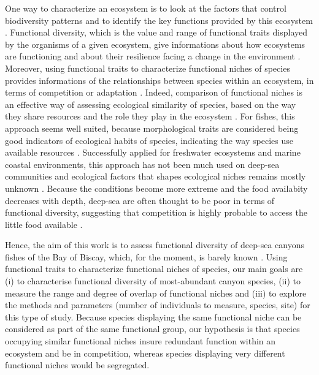 One way to characterize an ecosystem is to look at the factors that control biodiversity patterns and to identify the key functions provided by this ecosystem \citep{aneeshkumar2017,brindamour2011,farre2016}. Functional diversity, which is the value and range of functional traits displayed by the organisms of a given ecosystem, give informations about how ecosystems are functioning and about their resilience facing a change in the environment \citep{dumay2004,martini2020}. Moreover, using functional traits to characterize functional niches of species provides informations of the relationships between species within an ecosystem, in terms of competition or adaptation \citep{aneeshkumar2017}. Indeed, comparison of functional niches is an effective way of assessing ecological similarity of species, based on the way they share resources and the role they play in the ecosystem \citep{aneeshkumar2017,farre2016,winemiller1991}.
For fishes, this approach seems well suited, because morphological traits are considered being good indicators of ecological habits of species, indicating the way species use available resources \citep{farre2016,winemiller1991}. Successfully applied for freshwater ecosystems and marine coastal environments, this approach has not been much used on deep-sea communities and ecological factors that shapes ecological niches remains mostly unknown \citep{aneeshkumar2017,farre2016}. Because the conditions become more extreme and the food availabity decreases with depth, deep-sea are often thought to be poor in terms of functional diversity, suggesting that competition is highly probable to access the little food available \citep{mason2008}.

Hence, the aim of this work is to assess functional diversity of deep-sea canyons fishes of the Bay of Biscay, which, for the moment, is barely known \citep{kenchington2020}. Using functional traits to characterize functional niches of species, our main goals are (i) to characterise functional diversity of most-abundant canyon species, (ii) to measure the range and degree of overlap of functional niches and (iii) to explore the methods and parameters (number of individuals to measure, species, site) for this type of study. Because species displaying the same functional niche can be considered as part of the same functional group, our hypothesis is that species occupying similar functional niches insure redundant function within an ecosystem and be in competition, whereas species displaying very different functional niches would be segregated. 

